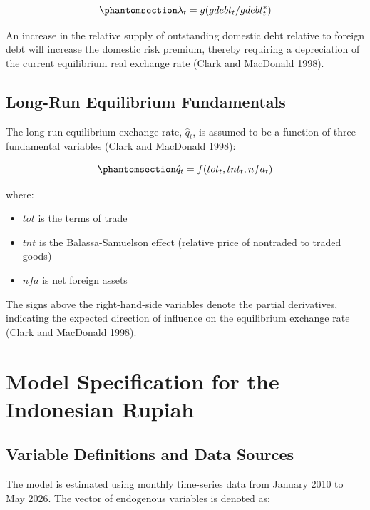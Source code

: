 \documentclass[
  manuscript=article,
  layout=publish,
  year=2026,
  volume=6,
]{den}
\providecommand{\tightlist}{%
  \setlength{\itemsep}{0pt}\setlength{\parskip}{0pt}}
\begin{document}
\begin{equation}\phantomsection\label{eq-risk-premium-function}{
\lambda_t = g(gdebt_t / gdebt_t^*)
}\end{equation}

An increase in the relative supply of outstanding domestic debt relative
to foreign debt will increase the domestic risk premium, thereby
requiring a depreciation of the current equilibrium real exchange rate
(Clark and MacDonald 1998).

\subsection{Long-Run Equilibrium
Fundamentals}\label{long-run-equilibrium-fundamentals}

The long-run equilibrium exchange rate, \(\hat{q}_t\), is assumed to be
a function of three fundamental variables (Clark and MacDonald 1998):

\begin{equation}\phantomsection\label{eq-long-run-fundamentals}{
\hat{q}_t = f(tot_t, tnt_t, nfa_t)
}\end{equation}

where:

\begin{itemize}
\tightlist
\item
  \(tot\) is the terms of trade
\item
  \(tnt\) is the Balassa-Samuelson effect (relative price of nontraded
  to traded goods)
\item
  \(nfa\) is net foreign assets
\end{itemize}

The signs above the right-hand-side variables denote the partial
derivatives, indicating the expected direction of influence on the
equilibrium exchange rate (Clark and MacDonald 1998).

\section{Model Specification for the Indonesian
Rupiah}\label{model-specification-for-the-indonesian-rupiah}

\subsection{Variable Definitions and Data
Sources}\label{variable-definitions-and-data-sources}

The model is estimated using monthly time-series data from January 2010
to May 2026. The vector of endogenous variables is denoted as:
\end{document}
